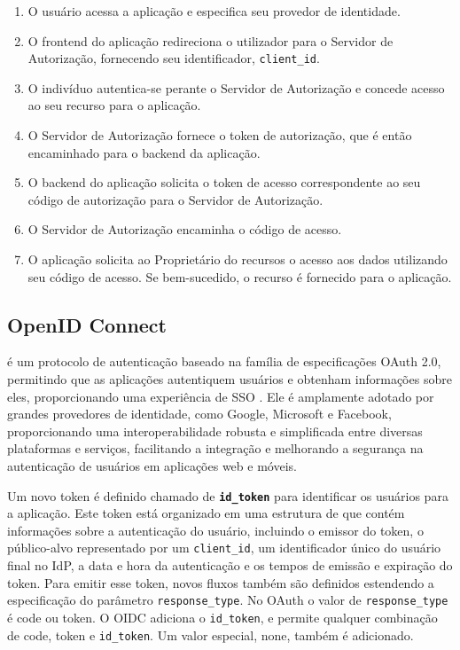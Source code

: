\begin{enumerate}

    \item O usuário acessa a aplicação e especifica seu provedor de identidade.
    
    \item O frontend do aplicação redireciona o utilizador para o Servidor de Autorização, fornecendo seu identificador, \texttt{client\_id}.
    
    \item O indivíduo autentica-se perante o Servidor de Autorização e concede acesso ao seu recurso para o aplicação.
    
    \item O Servidor de Autorização fornece o token de autorização, que é então encaminhado para o backend da aplicação.
    
    \item O backend do aplicação solicita o token de acesso correspondente ao seu código de autorização para o Servidor de Autorização.
    
    \item O Servidor de Autorização encaminha o código de acesso.
     
    \item O aplicação solicita ao Proprietário do recursos o acesso aos dados utilizando seu código de acesso. Se bem-sucedido, o recurso é fornecido para o aplicação.

    
\end{enumerate}

\subsection{OpenID Connect}\label{subsec:OIDC}

 é um protocolo de autenticação baseado na família de especificações OAuth 2.0, permitindo que as aplicações autentiquem usuários e obtenham informações sobre eles, proporcionando uma experiência de \acs{SSO} \cite{openid}. Ele é amplamente adotado por grandes provedores de identidade, como Google, Microsoft e Facebook, proporcionando uma interoperabilidade robusta e simplificada entre diversas plataformas e serviços, facilitando a integração e melhorando a segurança na autenticação de usuários em aplicações web e móveis.

Um novo token é definido chamado de \textbf{\texttt{id\_token}} para identificar os usuários para a aplicação. Este token está organizado em uma estrutura de  que contém informações sobre a autenticação do usuário, incluindo o emissor do token, o público-alvo representado por um \texttt{client\_id}, um identificador único do usuário final no IdP, a data e hora da autenticação e os tempos de emissão e expiração do token. Para emitir esse token, novos fluxos também são definidos estendendo a especificação do parâmetro \texttt{response\_type}. No OAuth o valor de \texttt{response\_type} é code ou token. O \acs{OIDC} adiciona o \texttt{id\_token}, e permite qualquer combinação de code, token e \texttt{id\_token}. Um valor especial, none, também é adicionado. 

